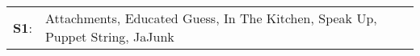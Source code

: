 \begin{supertabular}{p{0.03\textwidth}p{0.92\textwidth}}
 \textbf{S1}:  &  Attachments\textsuperscript{}, \enspace Educated Guess\textsuperscript{}, \enspace In The Kitchen\textsuperscript{}, \enspace Speak Up\textsuperscript{}, \enspace Puppet String\textsuperscript{}, \enspace JaJunk\textsuperscript{}  \enspace  \\
\end{supertabular}

